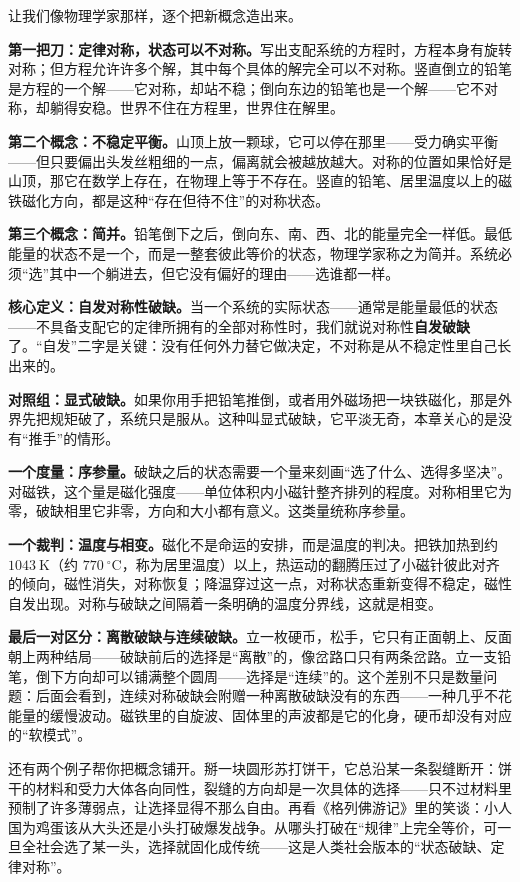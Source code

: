\begin{mainline}
让我们像物理学家那样，逐个把新概念造出来。

\textbf{第一把刀：定律对称，状态可以不对称。}写出支配系统的方程时，方程本身有旋转对称；但方程允许许多个解，其中每个具体的解完全可以不对称。竖直倒立的铅笔是方程的一个解——它对称，却站不稳；倒向东边的铅笔也是一个解——它不对称，却躺得安稳。世界不住在方程里，世界住在解里。

\textbf{第二个概念：不稳定平衡。}山顶上放一颗球，它可以停在那里——受力确实平衡——但只要偏出头发丝粗细的一点，偏离就会被越放越大。对称的位置如果恰好是山顶，那它在数学上存在，在物理上等于不存在。竖直的铅笔、居里温度以上的磁铁磁化方向，都是这种“存在但待不住”的对称状态。

\textbf{第三个概念：简并。}铅笔倒下之后，倒向东、南、西、北的能量完全一样低。最低能量的状态不是一个，而是一整套彼此等价的状态，物理学家称之为简并。系统必须“选”其中一个躺进去，但它没有偏好的理由——选谁都一样。

\textbf{核心定义：自发对称性破缺。}当一个系统的实际状态——通常是能量最低的状态——不具备支配它的定律所拥有的全部对称性时，我们就说对称性\textbf{自发破缺}了。“自发”二字是关键：没有任何外力替它做决定，不对称是从不稳定性里自己长出来的。

\textbf{对照组：显式破缺。}如果你用手把铅笔推倒，或者用外磁场把一块铁磁化，那是外界先把规矩破了，系统只是服从。这种叫显式破缺，它平淡无奇，本章关心的是没有“推手”的情形。

\textbf{一个度量：序参量。}破缺之后的状态需要一个量来刻画“选了什么、选得多坚决”。对磁铁，这个量是磁化强度——单位体积内小磁针整齐排列的程度。对称相里它为零，破缺相里它非零，方向和大小都有意义。这类量统称序参量。

\textbf{一个裁判：温度与相变。}磁化不是命运的安排，而是温度的判决。把铁加热到约 \(1043\ \mathrm{K}\)（约 \(770\ ^{\circ}\mathrm{C}\)，称为居里温度）以上，热运动的翻腾压过了小磁针彼此对齐的倾向，磁性消失，对称恢复；降温穿过这一点，对称状态重新变得不稳定，磁性自发出现。对称与破缺之间隔着一条明确的温度分界线，这就是相变。

\textbf{最后一对区分：离散破缺与连续破缺。}立一枚硬币，松手，它只有正面朝上、反面朝上两种结局——破缺前后的选择是“离散”的，像岔路口只有两条岔路。立一支铅笔，倒下方向却可以铺满整个圆周——选择是“连续”的。这个差别不只是数量问题：后面会看到，连续对称破缺会附赠一种离散破缺没有的东西——一种几乎不花能量的缓慢波动。磁铁里的自旋波、固体里的声波都是它的化身，硬币却没有对应的“软模式”。

还有两个例子帮你把概念铺开。掰一块圆形苏打饼干，它总沿某一条裂缝断开：饼干的材料和受力大体各向同性，裂缝的方向却是一次具体的选择——只不过材料里预制了许多薄弱点，让选择显得不那么自由。再看《格列佛游记》里的笑谈：小人国为鸡蛋该从大头还是小头打破爆发战争。从哪头打破在“规律”上完全等价，可一旦全社会选了某一头，选择就固化成传统——这是人类社会版本的“状态破缺、定律对称”。


\end{mainline}

